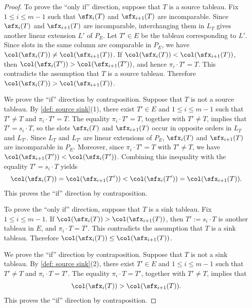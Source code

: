 \documentclass[12pt, reqno]{amsart}
\numberwithin{equation}{section}
\numberwithin{figure}{section}
\numberwithin{table}{section}
\theoremstyle{definition}
\begin{document}
\begin{proof}
To prove the ``only if'' direction, suppose that $T$ is a source tableau.
Fix $1 \le i \le m-1$ such that $\sfx_i(T)$ and $\sfx_{i+1}(T)$ are incomparable.
Since $\sfx_i(T)$ and $\sfx_{i+1}(T)$ are incomparable, interchanging them in $L_T$ gives another linear extension $L'$ of $P_E$.
Let $T' \in E$ be the tableau corresponding to $L'$.
Since slots in the same column are comparable in $P_E$, we have $\col(\sfx_i(T)) \neq \col(\sfx_{i+1}(T))$.
If $\col(\sfx_i(T)) < \col(\sfx_{i+1}(T))$, then $\col(\sfx_i(T')) > \col(\sfx_{i+1}(T'))$, and hence $\pi_i \cdot T'=T$.
This contradicts the assumption that $T$ is a source tableau.
Therefore $\col(\sfx_i(T))>\col(\sfx_{i+1}(T))$.

We prove the ``if'' direction by contraposition.
Suppose that $T$ is not a source tableau.
By \cref{def: source sink}(1), there exist $T' \in E$ and $1 \le i \le m-1$ such that $T'\ne T$ and $\pi_i \cdot T'=T$.
The equality $\pi_i \cdot T'=T$, together with $T'\ne T$, implies that $T'=s_i \cdot T$, so the slots $\sfx_i(T)$ and $\sfx_{i+1}(T)$ occur in opposite orders in $L_T$ and $L_{T'}$.
Since $L_T$ and $L_{T'}$ are linear extensions of $P_E$, $\sfx_i(T)$ and $\sfx_{i+1}(T)$ are incomparable in $P_E$.
Moreover, since $\pi_i \cdot T'=T$ with $T'\ne T$, we have $\col(\sfx_{i+1}(T')) < \col(\sfx_i(T'))$.
Combining this inequality with the equality $T' = s_i \cdot T$ yields
\[
\col(\sfx_i(T)) = \col(\sfx_{i+1}(T')) < \col(\sfx_i(T')) = \col(\sfx_{i+1}(T)).
\]
This proves the ``if'' direction by contraposition.
\medskip

To prove the ``only if'' direction, suppose that $T$ is a sink tableau.
Fix $1 \le i \le m-1$.
If $\col(\sfx_i(T))>\col(\sfx_{i+1}(T))$, then $T':=s_i \cdot T$ is another tableau in $E$, and $\pi_i \cdot T=T'$.
This contradicts the assumption that $T$ is a sink tableau.
Therefore $\col(\sfx_i(T))\le\col(\sfx_{i+1}(T))$.

We prove the ``if'' direction by contraposition.
Suppose that $T$ is not a sink tableau.
By \cref{def: source sink}(2), there exist $T' \in E$ and $1 \le i \le m-1$ such that $T'\ne T$ and $\pi_i \cdot T=T'$.
The equality $\pi_i \cdot T=T'$, together with $T'\ne T$, implies that
\[
\col(\sfx_i(T))>\col(\sfx_{i+1}(T)).
\]
This proves the ``if'' direction by contraposition.
\end{proof}
\end{document}
